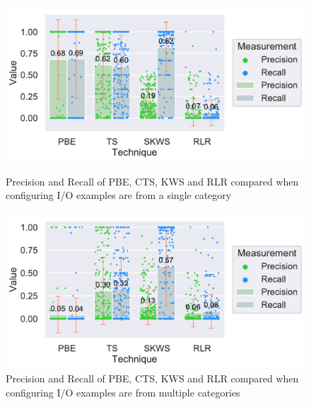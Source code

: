 \documentclass[\myrootdir/main.tex]{subfiles}
\begin{document}
\begin{figure}[htbp]
	\centering
	\begin{minipage}{0.45\textwidth}
		\centering
		\includegraphics[width=\textwidth, clip]{img/big-study/recall-precision-singlecategory-all.pdf}
		\caption{Precision and Recall of PBE, CTS, KWS and RLR compared when configuring I/O examples are from a single category}
		\label{fig:recall-precision-singlecategory-all}
	\end{minipage}\hfill
	\begin{minipage}{0.45\textwidth}
		\centering
		\includegraphics[width=\textwidth, clip]{img/big-study/recall-precision-multicategory-all.pdf}
		\caption{Precision and Recall of PBE, CTS, KWS and RLR compared when configuring I/O examples are from multiple categories}
		\label{fig:recall-precision-multicategory-all}
	\end{minipage}
\end{figure}
\end{document}
